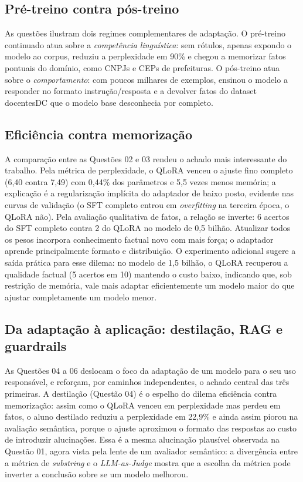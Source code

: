 \subsection{Pré-treino contra pós-treino}

As questões ilustram dois regimes complementares de adaptação. O pré-treino
continuado atua sobre a \emph{competência linguística}: sem rótulos, apenas expondo
o modelo ao corpus, reduziu a perplexidade em 90\% e chegou a memorizar fatos
pontuais do domínio, como CNPJs e CEPs de prefeituras. O pós-treino atua sobre o
\emph{comportamento}: com poucos milhares de exemplos, ensinou o modelo a responder
no formato instrução/resposta e a devolver fatos do dataset docentesDC que o modelo
base desconhecia por completo.

\subsection{Eficiência contra memorização}

A comparação entre as Questões 02 e 03 rendeu o achado mais interessante do
trabalho. Pela métrica de perplexidade, o QLoRA venceu o ajuste fino completo (6,40
contra 7,49) com 0,44\% dos parâmetros e 5,5 vezes menos memória; a explicação é a
regularização implícita do adaptador de baixo posto, evidente nas curvas de
validação (o SFT completo entrou em \textit{overfitting} na terceira época, o QLoRA
não). Pela avaliação qualitativa de fatos, a relação se inverte: 6 acertos do SFT
completo contra 2 do QLoRA no modelo de 0,5 bilhão. Atualizar todos os pesos
incorpora conhecimento factual novo com mais força; o adaptador aprende
principalmente formato e distribuição. O experimento adicional sugere a saída
prática para esse dilema: no modelo de 1,5 bilhão, o QLoRA recuperou a qualidade
factual (5 acertos em 10) mantendo o custo baixo, indicando que, sob restrição de
memória, vale mais adaptar eficientemente um modelo maior do que ajustar
completamente um modelo menor.

\subsection{Da adaptação à aplicação: destilação, RAG e guardrails}

As Questões 04 a 06 deslocam o foco da adaptação de um modelo para o seu uso
responsável, e reforçam, por caminhos independentes, o achado central das três
primeiras. A destilação (Questão 04) é o espelho do dilema eficiência contra
memorização: assim como o QLoRA venceu em perplexidade mas perdeu em fatos, o aluno
destilado reduziu a perplexidade em 22,9\% e ainda assim piorou na avaliação
semântica, porque o ajuste aproximou o formato das respostas ao custo de introduzir
alucinações. Essa é a mesma alucinação plausível observada na Questão 01, agora vista
pela lente de um avaliador semântico: a divergência entre a métrica de
\textit{substring} e o \textit{LLM-as-Judge} mostra que a escolha da métrica pode
inverter a conclusão sobre se um modelo melhorou.

